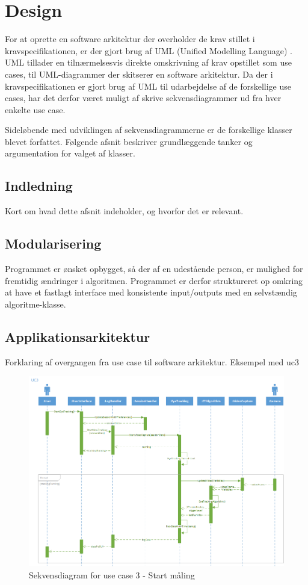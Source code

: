 \documentclass[rapport.tex]{subfiles}
\begin{document}
	\section{Design}
	For at oprette en software arkitektur der overholder de krav stillet i kravspecifikationen, er der gjort brug af UML (Unified Modelling Language) \cite{UML}. UML tillader en tilnærmelsesvis direkte omskrivning af krav opstillet som use cases, til UML-diagrammer der skitserer en software arkitektur. 
	Da der i kravspecifikationen er gjort brug af UML til udarbejdelse af de forskellige use cases, har det derfor været muligt af skrive sekvensdiagrammer ud fra hver enkelte use case. 
	
	Sideløbende med udviklingen af sekvensdiagrammerne er de forskellige klasser blevet forfattet. Følgende afsnit beskriver grundlæggende tanker og argumentation for valget af klasser.
	\subsection{Indledning}
	Kort om hvad dette afsnit indeholder, og hvorfor det er relevant. 	
	\subsection{Modularisering}
	Programmet er ønsket opbygget, så der af en udestående person, er mulighed for fremtidig ændringer i algoritmen. Programmet er derfor struktureret op omkring at have et fastlagt interface med konsistente input/outputs med en selvstændig algoritme-klasse. 
	\subsection{Applikationsarkitektur}
	Forklaring af overgangen fra use case til software arkitektur. Eksempel med uc3
	
	\begin{figure}
		\centering
		\includegraphics[width=1\linewidth]{UC3}
		\caption{Sekvensdiagram for use case 3 - Start måling}
		\label{fig:UC3}
	\end{figure}
	
\end{document}
